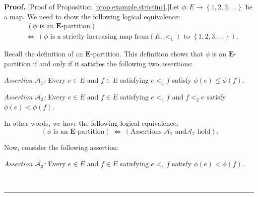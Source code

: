 \documentclass[numbers=enddot,12pt,final,onecolumn,notitlepage,abstracton]{scrartcl}
\theoremstyle{definition}
\newenvironment{proof}[1][Proof]{\noindent\textbf{#1.} }{\ \rule{0.5em}{0.5em}}
\newenvironment{verlong}{}{}
\begin{document}
\begin{verlong}
\begin{footnotesize}
\begin{proof}
[Proof of Proposition \ref{prop.example.strictinc}.]Let $\phi:E\rightarrow
\left\{  1,2,3,\ldots\right\}  $ be a map. We need to show the following
logical equivalence:%
\begin{align}
&  \ \left(  \phi\text{ is an }\mathbf{E}\text{-partition}\right) \nonumber\\
&  \Longleftrightarrow\ \left(  \phi\text{ is a strictly increasing map from
}\left(  E,<_{1}\right)  \text{ to }\left\{  1,2,3,\ldots\right\}  \right)  .
\label{pf.prop.example.strictlinc.goal}%
\end{align}


Recall the definition of an $\mathbf{E}$-partition. This definition shows that
$\phi$ is an $\mathbf{E}$-partition if and only if it satisfies the following
two assertions:

\textit{Assertion }$\mathcal{A}_{1}$\textit{:} Every $e\in E$ and $f\in E$
satisfying $e<_{1}f$ satisfy $\phi\left(  e\right)  \leq\phi\left(  f\right)
$.

\textit{Assertion }$\mathcal{A}_{2}$\textit{:} Every $e\in E$ and $f\in E$
satisfying $e<_{1}f$ and $f<_{2}e$ satisfy $\phi\left(  e\right)  <\phi\left(
f\right)  $.

In other words, we have the following logical equivalence:%
\[
\ \left(  \phi\text{ is an }\mathbf{E}\text{-partition}\right)
\ \Longleftrightarrow\ \left(  \text{Assertions }\mathcal{A}_{1}\text{ and
}\mathcal{A}_{2}\text{ hold}\right)  .
\]


Now, consider the following assertion:

\textit{Assertion }$\mathcal{A}_{3}$\textit{:} Every $e\in E$ and $f\in E$
satisfying $e<_{1}f$ satisfy $\phi\left(  e\right)  <\phi\left(  f\right)  $.


\end{proof}
\end{footnotesize}
\end{verlong}
\end{document}
